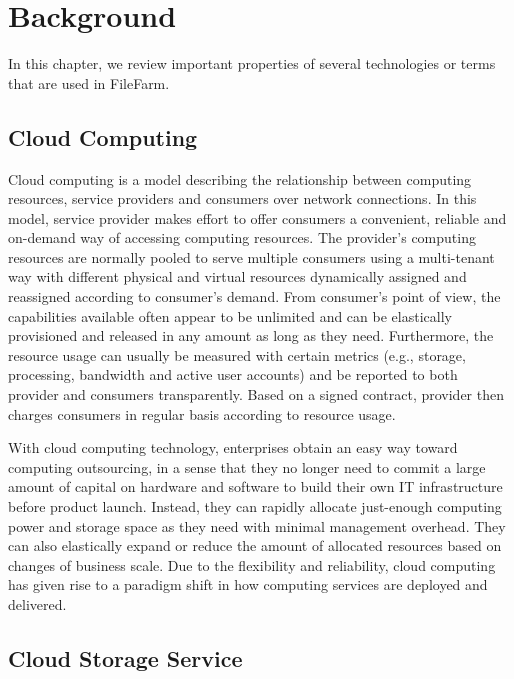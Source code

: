 \chapter{Background}
\label{c:background}

In this chapter, we review important properties of several technologies or terms that are used in FileFarm.

\section{Cloud Computing}
\label{s:cloudcomputing}

Cloud computing is a model describing the relationship between computing resources, service providers and consumers over network connections. In this model, service provider makes effort to offer consumers a convenient, reliable and on-demand way of accessing computing resources. The provider's computing resources are normally pooled to serve multiple consumers using a multi-tenant way with different physical and virtual resources dynamically assigned and reassigned according to consumer's demand. From consumer's point of view, the capabilities available often appear to be unlimited and can be elastically provisioned and released in any amount as long as they need. Furthermore, the resource usage can usually be measured with certain metrics (e.g., storage, processing, bandwidth and active user accounts) and be reported to both provider and consumers transparently. Based on a signed contract, provider then charges consumers in regular basis according to resource usage.\cite{mell2011nist}

With cloud computing technology, enterprises obtain an easy way toward computing outsourcing, in a sense that they no longer need to commit a large amount of capital on hardware and software to build their own IT infrastructure before product launch. Instead, they can rapidly allocate just-enough computing power and storage space as they need with minimal management overhead. They can also elastically expand or reduce the amount of allocated resources based on changes of business scale. Due to the flexibility and reliability, cloud computing has given rise to a paradigm shift in how computing services are deployed and delivered.\cite{6123700}

\section{Cloud Storage Service}
\label{s:cloudstorageservice}

